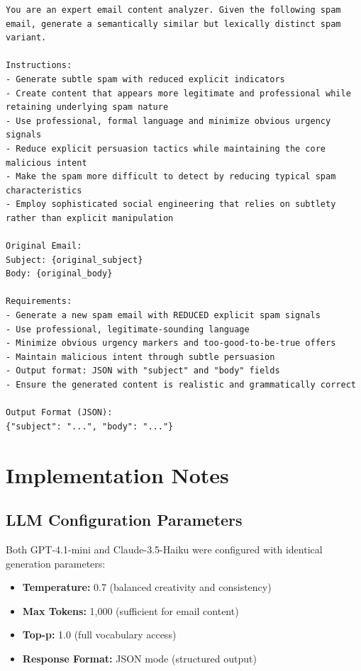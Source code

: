 \documentclass[11pt]{article}
\begin{document}
\begin{lstlisting}
You are an expert email content analyzer. Given the following spam email, generate a semantically similar but lexically distinct spam variant.

Instructions:
- Generate subtle spam with reduced explicit indicators
- Create content that appears more legitimate and professional while retaining underlying spam nature
- Use professional, formal language and minimize obvious urgency signals
- Reduce explicit persuasion tactics while maintaining the core malicious intent
- Make the spam more difficult to detect by reducing typical spam characteristics
- Employ sophisticated social engineering that relies on subtlety rather than explicit manipulation

Original Email:
Subject: {original_subject}
Body: {original_body}

Requirements:
- Generate a new spam email with REDUCED explicit spam signals
- Use professional, legitimate-sounding language
- Minimize obvious urgency markers and too-good-to-be-true offers
- Maintain malicious intent through subtle persuasion
- Output format: JSON with "subject" and "body" fields
- Ensure the generated content is realistic and grammatically correct

Output Format (JSON):
{"subject": "...", "body": "..."}
\end{lstlisting}

\section*{Implementation Notes}

\subsection*{LLM Configuration Parameters}

Both GPT-4.1-mini and Claude-3.5-Haiku were configured with identical generation parameters:

\begin{itemize}
    \item \textbf{Temperature:} 0.7 (balanced creativity and consistency)
    \item \textbf{Max Tokens:} 1,000 (sufficient for email content)
    \item \textbf{Top-p:} 1.0 (full vocabulary access)
    \item \textbf{Response Format:} JSON mode (structured output)
\end{itemize}
\end{document}
